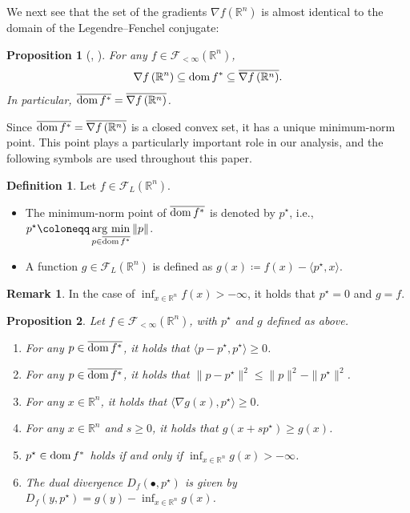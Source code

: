 \documentclass[11pt,a4paper]{article}
\theoremstyle{definition}
\newtheorem{dfn}{Definition}[section]
\newtheorem{rem}{Remark}[section]
\theoremstyle{plain}
\newtheorem{prop}[prop]{Proposition}
\newcommand{\RR}{{\mathbb{R}}}
\newcommand{\argmin}{\mathop{\rm arg~min}\limits}
\newcommand{\dom}{\mathop{\rm dom}}
\begin{document}
We next see that the set of the gradients $\nabla f\left(\RR^n\right)$ is almost identical to the domain of the Legendre--Fenchel conjugate:
\begin{prop}[{\cite[Equation~(1.4)]{Hirai2024}, \cite[Equation~(3.26)]{HS2024}}]
    \label{prop:dual_space}
    For any $f \in \mathcal{F}_{<\infty}(\RR^n)$,
    \[
        \nabla f\left(\RR^n\right) \subseteq \dom f^\ast \subseteq \overline{\nabla f\left(\RR^n\right)}.
    \]
    In particular, $\overline{\dom f^\ast} = \overline{\nabla f\left(\RR^n\right)}$.
\end{prop}
Since $\overline{\dom f^\ast} = \overline{\nabla f\left(\RR^n\right)}$ is a closed convex set, it has a unique minimum-norm point.
This point plays a particularly important role in our analysis, and the following symbols are used throughout this paper.
\begin{dfn}\label{dfn:minimum-norm point}
    Let $f \in \mathcal{F}_L(\RR^n)$.
    \begin{itemize}
        \item The minimum-norm point of $\overline{\dom f^\ast}$ is denoted by $p^\star$, i.e., $p^\star \coloneqq \argmin_{p \in \overline{\dom f^\ast}}\|p\|$.
        \item A function $g \in \mathcal{F}_L(\RR^n)$ is defined as $g(x) \coloneqq f(x) - \langle p^\star, x\rangle$.
    \end{itemize}
\end{dfn}
\begin{rem}
    In the case of $\inf_{x \in \RR^n}f(x) > -\infty$, it holds that $p^\star = 0$ and $g = f$.
\end{rem}
\begin{prop}\label{prop:pg}
    Let $f \in \mathcal{F}_{<\infty}(\RR^n)$, with $p^\star$ and $g$ defined as above.
    \begin{enumerate}
        \item[(a)] For any $p \in \overline{\dom f^\ast}$, it holds that $\langle p - p^\star, p^\star\rangle \ge 0$.
        \item[(b)] For any $p \in \overline{\dom f^\ast}$, it holds that $\|p - p^\star\|^2 \le \|p\|^2 - \|p^\star\|^2$.
        \item[(c)] For any $x \in \RR^n$, it holds that $\langle\nabla g(x), p^\star\rangle \ge 0$.
        \item[(d)] For any $x \in \RR^n$ and $s \ge 0$, it holds that $g(x + sp^\star) \ge g(x)$.
        \item[(e)] $p^\star \in \dom f^\ast$ holds if and only if $\inf_{x \in \RR^n}g(x) > -\infty$.
        \item[(f)] The dual divergence $D_f(\bullet, p^\star)$ is given by $D_f(y, p^\star) = g(y) - \inf_{x \in \RR^n}g(x)$.
    \end{enumerate}
\end{prop}
\end{document}
